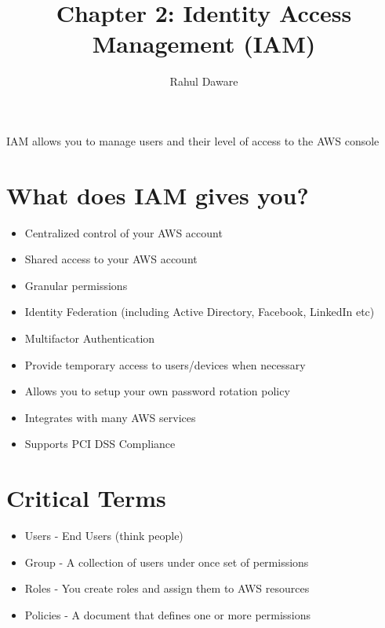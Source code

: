 \documentclass{article}
\author{Rahul Daware}
\begin{document}
\title{Chapter 2: Identity Access Management (IAM)}
\maketitle
\tableofcontents
\newpage


IAM allows you to manage users and their level of access to the AWS console 

\section{What does IAM gives you?}
\begin{itemize}
\item
Centralized control of your AWS account

\item
Shared access to your AWS account

\item
Granular permissions

\item
Identity Federation (including Active Directory, Facebook, LinkedIn etc)

\item
Multifactor Authentication

\item
Provide temporary access to users/devices when necessary

\item
Allows you to setup your own password rotation policy

\item
Integrates with many AWS services

\item
Supports PCI DSS Compliance
\end{itemize}

\section{Critical Terms}
\begin{itemize}
\item
Users - End Users (think people)

\item
Group - A collection of users under once set of permissions

\item
Roles - You create roles and assign them to AWS resources

\item
Policies - A document that defines one or more permissions

\end{itemize}
\end{document}
